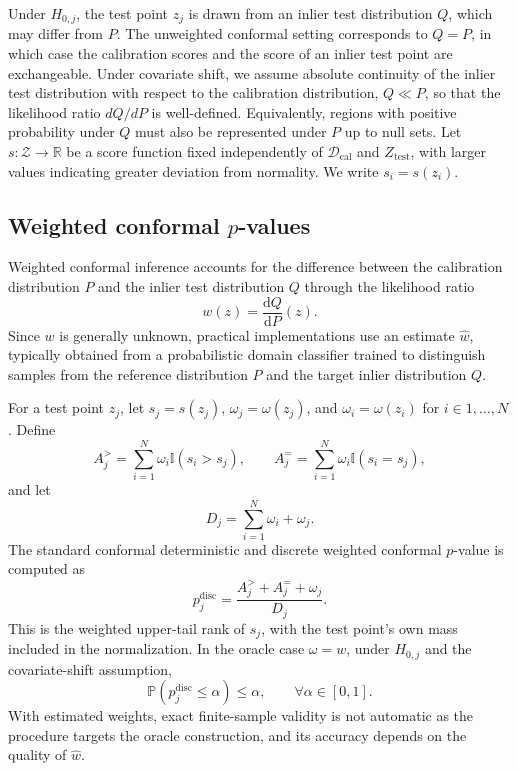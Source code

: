 Under $H_{0,j}$, the test point $z_j$ is drawn from an inlier test distribution $Q$, which may differ from $P$. The unweighted conformal setting corresponds to $Q=P$, in which case the calibration scores and the score of an inlier test point are exchangeable. Under covariate shift, we assume absolute continuity of the inlier test distribution with respect to the calibration distribution, $Q\ll P$, so that the likelihood ratio $dQ/dP$ is well-defined. Equivalently, regions with positive probability under $Q$ must also be represented under $P$ up to null sets. Let $s:\mathcal{Z}\to\mathbb{R}$ be a score function fixed independently of $\mathcal{D}_{\mathrm{cal}}$ and $Z_{\mathrm{test}}$, with larger values indicating greater deviation from normality. We write $s_i=s(z_i)$.

\subsection{Weighted conformal $p$-values}

Weighted conformal inference accounts for the difference between the calibration distribution $P$ and the inlier test distribution $Q$ through the likelihood ratio
\begin{equation*}
w(z)=\frac{\mathrm{d}Q}{\mathrm{d}P}(z).
\end{equation*}
Since $w$ is generally unknown, practical implementations use an estimate $\widehat w$, typically obtained from a probabilistic domain classifier trained to distinguish samples from the reference distribution $P$ and the target inlier distribution $Q$.

For a test point $z_j$, let $s_j=s(z_j)$, $\omega_j=\omega(z_j)$, and \mbox{$\omega_i=\omega(z_i)$} for $i\in{1,\dots,N}$. Define
\begin{equation*}
A_j^{>}
=
\sum_{i=1}^N \omega_i\mathbb{I}(s_i>s_j),
\qquad
A_j^{=}
=
\sum_{i=1}^N \omega_i\mathbb{I}(s_i=s_j),
\end{equation*}
and let
\begin{equation*}
D_j=\sum_{i=1}^N\omega_i+\omega_j.
\end{equation*}
The standard conformal deterministic and discrete weighted conformal $p$-value \cite{Jin2025} is computed as
\begin{equation*}\label{eq:weighted_ecdf_cons}
p_j^{\mathrm{disc}}
=
\frac{A_j^{>}+A_j^{=}+\omega_j}{D_j}.
\end{equation*}
This is the weighted upper-tail rank of $s_j$, with the test point's own mass included in the normalization. In the oracle case $\omega=w$, under $H_{0,j}$ and the covariate-shift assumption,
\begin{equation*}
\mathbb{P}\left(p_j^{\mathrm{disc}}\le \alpha\right)\le \alpha,
\qquad \forall \alpha\in[0,1].
\end{equation*}
With estimated weights, exact finite-sample validity is not automatic as the procedure targets the oracle construction, and its accuracy depends on the quality of $\widehat w$.

